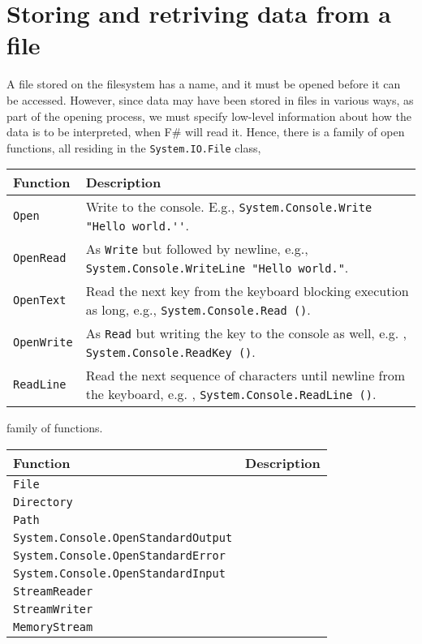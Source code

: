 \section{Storing and retriving data from a file}
A file stored on the filesystem has a name, and it must be opened before it can be accessed. However, since data may have been stored in files in various ways, as part of the opening process, we must specify low-level information about how the data is to be interpreted, when F\# will read it. Hence, there is a family of open functions, all residing in the \lstinline!System.IO.File! class,
\begin{center}
  \begin{tabularx}{\linewidth}{|l|X|}
    \hline
    Function & Description\\
    \hline
    \lstinline{Open} & Write to the console. E.g., \lstinline!System.Console.Write "Hello world.''!.\\
    \hline
    \lstinline{OpenRead} & As \lstinline!Write! but followed by newline, e.g., \mbox{\lstinline!System.Console.WriteLine "Hello world."!}.\\
    \hline
    \lstinline{OpenText} & Read the next key from the keyboard blocking execution as long, e.g., \mbox{\lstinline!System.Console.Read ()!}.\\
    \hline
    \lstinline{OpenWrite} & As \lstinline!Read! but writing the key to the console as well, e.g. , \mbox{\lstinline!System.Console.ReadKey ()!}.\\
    \hline
    \lstinline{ReadLine} & Read the next sequence of characters until newline from the keyboard, e.g. , \mbox{\lstinline!System.Console.ReadLine ()!}.\\
    \hline
  \end{tabularx}
\end{center}

 family of functions. 

\begin{center}
  \begin{tabularx}{\linewidth}{|l|X|}
    \hline
    Function & Description\\
    \hline
    \lstinline{File} & \\
    \hline
    \lstinline{Directory} & \\
    \hline
    \lstinline{Path} & \\
    \hline
    \hline
    \lstinline{System.Console.OpenStandardOutput} & \\
    \hline
    \lstinline{System.Console.OpenStandardError} & \\
    \hline
    \lstinline{System.Console.OpenStandardInput} & \\
    \hline
    \lstinline{StreamReader} & \\
    \hline
    \lstinline{StreamWriter} & \\
    \hline
    \lstinline{MemoryStream} & \\
    \hline
  \end{tabularx}
\end{center}

